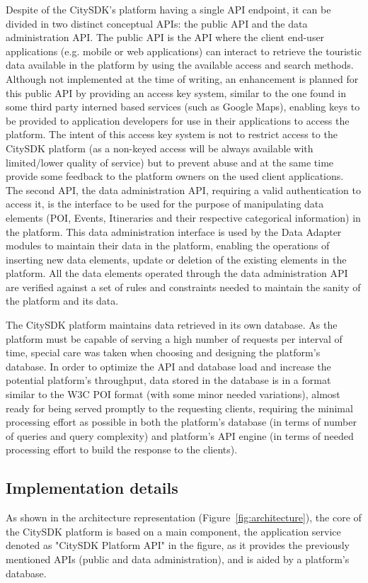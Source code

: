\documentclass[times]{ettauth}
\begin{document}
Despite of the CitySDK's platform having a single API endpoint, it can be divided in two distinct conceptual APIs: the public API and the data administration API. 
The public API is the API where the client end-user applications (e.g. mobile or web applications) can interact to retrieve the touristic data available in the platform by using the available access and search methods. 
Although not implemented at the time of writing, an enhancement is planned for this public API by providing an access key system, similar to the one found in some third party interned based services (such as Google Maps), enabling keys to be provided to application developers for use in their applications to access the platform. 
The intent of this access key system is not to restrict access to the CitySDK platform (as a non-keyed access will be always available with limited/lower quality of service) but to prevent abuse and at the same time provide some feedback to the platform owners on the used client applications. 
The second API, the data administration API, requiring a valid authentication to access it, is the interface to be used for the purpose of manipulating data elements (\ac{POI}, Events, Itineraries and their respective categorical information) in the platform. 
This data administration interface is used by the Data Adapter modules to maintain their data in the platform, enabling the operations of inserting new data elements, update or deletion of the existing elements in the platform. 
All the data elements operated through the data administration API are verified against a set of rules and constraints needed to maintain the sanity of the platform and its data.

The CitySDK platform maintains data retrieved in its own database. 
As the platform must be capable of serving a high number of requests per interval of time, special care was taken when choosing and designing the platform's database. 
In order to optimize the API and database load and increase the potential platform's throughput, data stored in the database is in a format similar to the W3C POI format (with some minor needed variations), almost ready for being served promptly to the requesting clients, requiring the minimal processing effort as possible in both the platform's database (in terms of number of queries and query complexity) and platform's API engine (in terms of needed processing effort to build the response to the clients).

\subsection{Implementation details}
As shown in the architecture representation (Figure~\ref{fig:architecture}), the core of the CitySDK platform is based on a main component, the application service denoted as "CitySDK Platform API" in the figure, as it provides the previously mentioned APIs (public and data administration), and is aided by a platform's database. 
\end{document}
